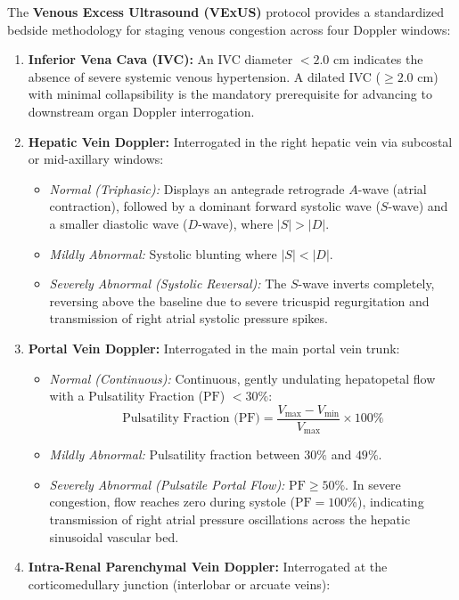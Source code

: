 \documentclass[11pt,a4paper]{article}
\begin{document}
The \textbf{Venous Excess Ultrasound (VExUS)} protocol provides a standardized bedside methodology for staging venous congestion across four Doppler windows:
\begin{enumerate}[leftmargin=2em]
    \item \textbf{Inferior Vena Cava (IVC):} An IVC diameter $< 2.0\text{ cm}$ indicates the absence of severe systemic venous hypertension. A dilated IVC ($\ge 2.0\text{ cm}$) with minimal collapsibility is the mandatory prerequisite for advancing to downstream organ Doppler interrogation.
    \item \textbf{Hepatic Vein Doppler:} Interrogated in the right hepatic vein via subcostal or mid-axillary windows:
    \begin{itemize}
        \item \textit{Normal (Triphasic):} Displays an antegrade retrograde $A$-wave (atrial contraction), followed by a dominant forward systolic wave ($S$-wave) and a smaller diastolic wave ($D$-wave), where $|S| > |D|$.
        \item \textit{Mildly Abnormal:} Systolic blunting where $|S| < |D|$.
        \item \textit{Severely Abnormal (Systolic Reversal):} The $S$-wave inverts completely, reversing above the baseline due to severe tricuspid regurgitation and transmission of right atrial systolic pressure spikes.
    \end{itemize}
    \item \textbf{Portal Vein Doppler:} Interrogated in the main portal vein trunk:
    \begin{itemize}
        \item \textit{Normal (Continuous):} Continuous, gently undulating hepatopetal flow with a Pulsatility Fraction ($\text{PF}$) $< 30\%$:
        \begin{equation}
            \text{Pulsatility Fraction (PF)} = \frac{V_{\text{max}} - V_{\text{min}}}{V_{\text{max}}} \times 100\%
        \end{equation}
        \item \textit{Mildly Abnormal:} Pulsatility fraction between $30\%$ and $49\%$.
        \item \textit{Severely Abnormal (Pulsatile Portal Flow):} $\text{PF} \ge 50\%$. In severe congestion, flow reaches zero during systole ($\text{PF} = 100\%$), indicating transmission of right atrial pressure oscillations across the hepatic sinusoidal vascular bed.
    \end{itemize}
    \item \textbf{Intra-Renal Parenchymal Vein Doppler:} Interrogated at the corticomedullary junction (interlobar or arcuate veins):

\end{enumerate}
\end{document}
